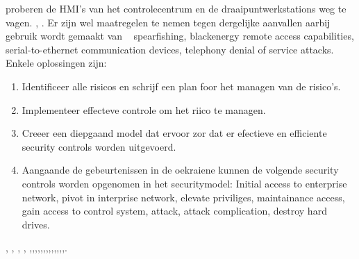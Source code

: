 \documentclass{article}
\begin{document}
	proberen de HMI's van het controlecentrum en de draaipuntwerkstations weg te vagen.
	\cite{Whitehead2017ukrainepoweroutage},
	\cite{boozallen2016lightwentout}.
	Er zijn wel maatregelen te nemen tegen dergelijke aanvallen aarbij gebruik wordt gemaakt van
	~\cite{Whitehead2017ukrainepoweroutage}
	\cite{boozallen2016lightwentout}
	spearfishing,
	blackenergy
	remote access capabilities,
	serial-to-ethernet communication devices,
	telephony denial of service attacks.
	Enkele oplossingen zijn:
	\begin{enumerate}
		\item  Identificeer alle risicos en schrijf een plan foor het managen van de risico's.
		\item  Implementeer  effecteve controle  om het riico te managen.
		\item  Creeer een diepgaand model dat ervoor zor dat er efectieve en efficiente security controls worden uitgevoerd.
		\item Aangaande de gebeurtenissen in de oekraiene kunnen de volgende security controls worden opgenomen in het securitymodel: Initial access to enterprise network, pivot in interprise network, elevate priviliges, maintainance access, gain access to control system, attack, attack complication, destroy hard drives.
	\end{enumerate}
	\cite{Whitehead2017ukrainepoweroutage}
	\cite{shahzad2014ScadaProtocolsPollingScenario},
	\cite{grammatikis2019AttackIEC6087505104},
	\cite{2017win32industroyer},
	\cite{yadav2020reviewScadaArchitecture},
	\cite{arrizabalaga2020surveyiiotProtocols},\cite{fauri2017EncryptionICS},\cite{resch31102019IEC62351secureCommunication},\cite{levalle2020FuzzingICSProtocols},\cite{blackhatusa2017},\cite{blackhatusa2017},\cite{abb30062017crashoverridenotification},\cite{spinner2018crashoverrideiot},\cite{njccicthreat08102017crashovverrideprofile},\cite{slowikvb2018crashoverride},\cite{crashoverridenetwork},\cite{wikiindustroyer},\cite{icsSecurityRussianHacking},\cite{holappa2017threattoElectricityNetworks}.
\end{document}
